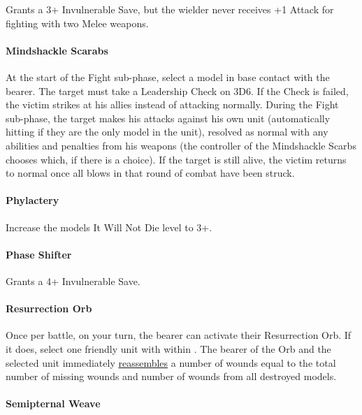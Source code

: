Grants a 3+ Invulnerable Save, but the wielder never receives +1 Attack for fighting with two Melee weapons.

\paragraph*{Mindshackle Scarabs} \label{Mindshackle Scarabs}

At the start of the Fight sub-phase, select a model in base contact with the bearer. The target must take a Leadership Check on 3D6. If the Check is failed, the victim strikes at his allies instead of attacking normally. During the Fight sub-phase, the target makes his attacks against his own unit (automatically hitting if they are the only model in the unit), resolved as normal with any abilities and penalties from his weapons (the controller of the Mindshackle Scarbs chooses which, if there is a choice). If the target is still alive, the victim returns to normal once all blows in that round of combat have been struck.

\paragraph*{Phylactery} \label{Phylactery}

Increase the models It Will Not Die level to 3+.

\paragraph*{Phase Shifter} \label{Phase Shifter}

Grants a 4+ Invulnerable Save.

\paragraph*{Resurrection Orb} \label{Resurrection Orb}

Once per battle, on your turn, the bearer can activate their Resurrection Orb. If it does, select one friendly unit with  within . The bearer of the Orb and the selected unit immediately \textcolor{violet}{\hyperref[Reanimation Protocols]{reassembles}} a number of wounds equal to the total number of missing wounds and number of wounds from all destroyed models.

\paragraph*{Semipternal Weave} \label{Sempiternal Weave}

